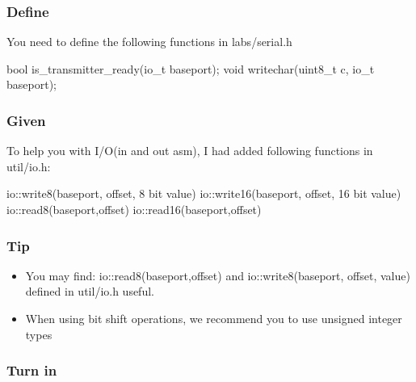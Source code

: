 \documentclass[]{book}
\newenvironment{Shaded}{}{}
\newcommand{\DataTypeTok}[1]{\textcolor[rgb]{0.50,0.00,0.00}{{#1}}}
\newcommand{\DecValTok}[1]{\textcolor[rgb]{0.00,0.00,1.00}{{#1}}}
\newcommand{\NormalTok}[1]{{#1}}
\begin{document}
\subsubsection*{Define}\label{define-1}

You need to define the following functions in labs/serial.h

\begin{Shaded}
\begin{Highlighting}[]
    \NormalTok{bool is_transmitter_ready(io_t baseport);}
    \DataTypeTok{void} \NormalTok{writechar(}\DataTypeTok{uint8_t} \NormalTok{c, io_t baseport);}
\end{Highlighting}
\end{Shaded}

\subsubsection*{Given}\label{given-1}

To help you with I/O(in and out asm), I had added following functions in
util/io.h:

\begin{Shaded}
\begin{Highlighting}[]
    \NormalTok{io::write8(baseport, offset, }\DecValTok{8} \NormalTok{bit value)}
    \NormalTok{io::write16(baseport, offset, }\DecValTok{16} \NormalTok{bit value)}
    \NormalTok{io::read8(baseport,offset)}
    \NormalTok{io::read16(baseport,offset)}
\end{Highlighting}
\end{Shaded}

\subsubsection*{Tip}\label{tip-1}

\begin{itemize}
\itemsep1pt\parskip0pt
\item
  You may find: io::read8(baseport,offset) and io::write8(baseport,
  offset, value) defined in util/io.h useful.
\item
  When using bit shift operations, we recommend you to use unsigned
  integer types
\end{itemize}

\subsubsection*{Turn in}\label{turn-in-1}
\end{document}
